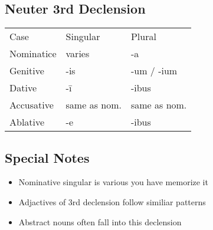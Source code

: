 \subsection*{Neuter 3rd Declension}
\begin{center}
  \begin{tabular}{lll}
    Case & Singular & Plural \\ 
    Nominatice & varies & -a \\ 
    Genitive & -is & -um / -ium \\ 
    Dative & -ī & -ibus \\ 
    Accusative & same as nom. & same as nom. \\ 
    Ablative & -e & -ibus \\
  \end{tabular}
\end{center}
\subsection*{Special Notes}
\begin{itemize}
  \item Nominative singular is various you have memorize it 
  \item Adjactives of 3rd declension follow similiar patterns 
  \item Abstract nouns often fall into this declension
\end{itemize}

